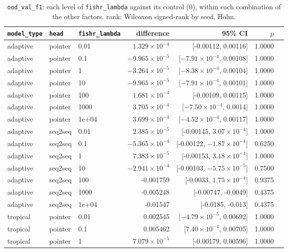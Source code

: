 \documentclass[10pt]{article}
\begin{document}
{\small
\begin{longtable}{lllrrrl}
\caption{\texttt{ood\_val\_f1}: each level of \texttt{fishr\_lambda} against its control (0), within each combination of the other factors. rank: Wilcoxon signed-rank by seed, Holm.}\label{tab:control-ood_val_f1}\\
\toprule
\texttt{model\_type} & \texttt{head} & \texttt{fishr\_lambda} & difference & 95\% CI & $p$ & \\
\midrule
\endhead
adaptive & pointer & 0.01 & $1.329\times10^{-4}$ & [-0.00112, 0.00116] & 1.0000 & \\
adaptive & pointer & 0.1 & $-9.965\times10^{-5}$ & [$-7.91\times10^{-4}$, 0.00108] & 1.0000 & \\
adaptive & pointer & 1 & $-3.264\times10^{-5}$ & [$-8.38\times10^{-4}$, 0.00104] & 1.0000 & \\
adaptive & pointer & 10 & $-9.965\times10^{-5}$ & [$-7.91\times10^{-4}$, 0.00101] & 1.0000 & \\
adaptive & pointer & 100 & $1.681\times10^{-4}$ & [-0.00109, 0.00115] & 1.0000 & \\
adaptive & pointer & 1000 & $3.705\times10^{-4}$ & [$-7.50\times10^{-4}$, 0.0014] & 1.0000 & \\
adaptive & pointer & 1e+04 & $3.699\times10^{-4}$ & [$-4.52\times10^{-4}$, 0.00117] & 1.0000 & \\
adaptive & seq2seq & 0.01 & $2.385\times10^{-5}$ & [-0.00145, $3.07\times10^{-4}$] & 1.0000 & \\
adaptive & seq2seq & 0.1 & $-5.365\times10^{-4}$ & [-0.00122, $-1.87\times10^{-4}$] & 0.6250 & \\
adaptive & seq2seq & 1 & $7.383\times10^{-5}$ & [-0.00153, $3.18\times10^{-4}$] & 1.0000 & \\
adaptive & seq2seq & 10 & $-2.941\times10^{-4}$ & [-0.00103, $-5.75\times10^{-5}$] & 0.7500 & \\
adaptive & seq2seq & 100 & -0.001759 & [-0.0033, $1.75\times10^{-4}$] & 0.9375 & \\
adaptive & seq2seq & 1000 & -0.005248 & [-0.00747, -0.0049] & 0.4375 & \\
adaptive & seq2seq & 1e+04 & -0.01547 & [-0.0185, -0.013] & 0.4375 & \\
tropical & pointer & 0.01 & 0.002545 & [$-4.79\times10^{-5}$, 0.00692] & 1.0000 & \\
tropical & pointer & 0.1 & 0.005462 & [$7.40\times10^{-4}$, 0.00705] & 1.0000 & \\
tropical & pointer & 1 & $7.079\times10^{-5}$ & [-0.00179, 0.00596] & 1.0000 & \\

\end{longtable}}
\end{document}
